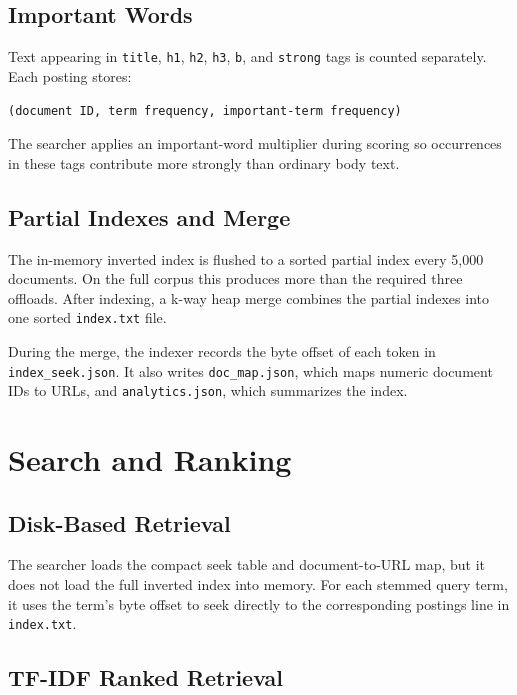 \documentclass[11pt]{article}
\newcommand{\code}[1]{\texttt{#1}}
\begin{document}
\subsection{Important Words}

Text appearing in \code{title}, \code{h1}, \code{h2}, \code{h3}, \code{b}, and
\code{strong} tags is counted separately. Each posting stores:

\begin{center}
\code{(document ID, term frequency, important-term frequency)}
\end{center}

The searcher applies an important-word multiplier during scoring so occurrences
in these tags contribute more strongly than ordinary body text.

\subsection{Partial Indexes and Merge}

The in-memory inverted index is flushed to a sorted partial index every 5,000
documents. On the full corpus this produces more than the required three
offloads. After indexing, a k-way heap merge combines the partial indexes into
one sorted \code{index.txt} file.

During the merge, the indexer records the byte offset of each token in
\code{index\_seek.json}. It also writes \code{doc\_map.json}, which maps numeric
document IDs to URLs, and \code{analytics.json}, which summarizes the index.

\section{Search and Ranking}

\subsection{Disk-Based Retrieval}

The searcher loads the compact seek table and document-to-URL map, but it does
not load the full inverted index into memory. For each stemmed query term, it
uses the term's byte offset to seek directly to the corresponding postings line
in \code{index.txt}.

\subsection{TF-IDF Ranked Retrieval}
\end{document}
